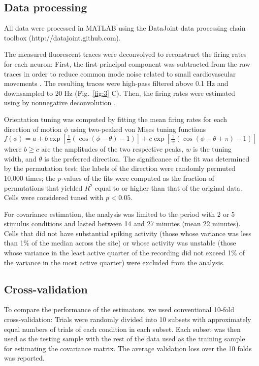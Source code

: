 \subsection*{Data processing}
All data were processed in MATLAB using the DataJoint data processing chain toolbox (http://datajoint.github.com).

The measured fluorescent traces were deconvolved to reconstruct the firing rates for each neuron: First, the first principal component was subtracted from the raw traces in order to reduce common mode noise related to small cardiovascular movements \citep{Cotton:2013}. The resulting traces were high-pass filtered above 0.1 Hz and downsampled to 20 Hz (Fig.~\ref{fig:3} C). Then, the firing rates were estimated using by nonnegative deconvolution \citep{Vogelstein:2010}.

Orientation tuning was computed by fitting the mean firing rates for each direction of motion $\phi$ using two-peaked von Mises tuning functions $f(\phi)=a + b\exp\left[\frac 1 w(\cos(\phi-\theta)-1) \right] + c\exp\left[\frac 1 w(\cos(\phi-\theta+\pi)-1) \right]$ where $b\ge c$ are the amplitudes of the two respective peaks, $w$ is the tuning width, and  $\theta$ is the preferred direction. The significance of the fit was determined by the permutation test: the labels of the direction were randomly permuted 10,000 times; the $p$-values of the fits were computed as the fraction of permutations that yielded $R^2$ equal to or higher than that of the original data.  Cells were considered tuned with $p<0.05$.

For covariance estimation, the analysis was limited to the period with 2 or 5 stimulus conditions and lasted between 14 and 27 minutes (mean 22 minutes).  Cells that did not have substantial spiking activity (those whose variance was less than 1\% of the median across the site) or whose activity was unstable (those whose variance in the least active quarter of the recording did not exceed 1\% of the variance in the most active quarter) were excluded from the analysis.

\subsection*{Cross-validation}
To compare the performance of the estimators, we used conventional 10-fold cross-validation: Trials were randomly divided into 10 subsets with approximately equal numbers of trials of each condition in each subset. Each subset was then used as the testing sample with the rest of the data used as the training sample for estimating the covariance matrix. The average validation loss over the 10 folds was reported.

